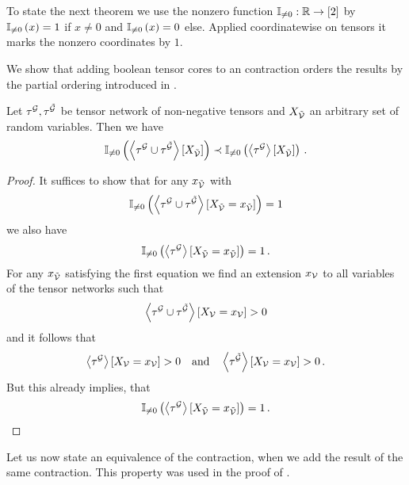 
To state the next theorem we use the nonzero function $\mathbb{I}_{\neq0}: \mathbb{R} \rightarrow [2]$ by $\mathbb{I}_{\neq0}\left(x\right)=1$ if $x\neq0$ and $\mathbb{I}_{\neq0}\left(x\right)=0$ else.
Applied coordinatewise on tensors it marks the nonzero coordinates by $1$.

We show that adding boolean tensor cores to an contraction orders the results by the partial ordering introduced in .

\begin{theorem}\label{the:monotonicityBinaryContractions}
	Let $\tau^{\mathcal{G}}, \tau^{\tilde{\mathcal{G}}}$ be tensor network of non-negative tensors and $X_{\tilde{\mathcal{V}}}$ an arbitrary set of random variables. %
	Then we have
	\begin{align*}
		\mathbb{I}_{\neq0}\left(\left\langle \tau^{\mathcal{G}}\cup\tau^{\tilde{\mathcal{G}}}\right\rangle \left[ X_{\tilde{\mathcal{V}}} \right]\right) \prec
		\mathbb{I}_{\neq0}\left(\left\langle \tau^{\mathcal{G}}\right\rangle \left[ X_{\tilde{\mathcal{V}}} \right]\right) \, .
	\end{align*}
\end{theorem}
\begin{proof}
	It suffices to show that for any $x_{\tilde{\mathcal{V}}}$ with
		\[ \mathbb{I}_{\neq0}\left(\left\langle \tau^{\mathcal{G}}\cup\tau^{\tilde{\mathcal{G}}}\right\rangle \left[ X_{\tilde{\mathcal{V}}}=x_{\tilde{\mathcal{V}}} \right]\right)=1 \]
	we also have
		\[ \mathbb{I}_{\neq0}\left(\left\langle \tau^{\mathcal{G}}\right\rangle \left[ X_{\tilde{\mathcal{V}}}=x_{\tilde{\mathcal{V}}} \right]\right)=1 \, . \]
	For any $x_{\tilde{\mathcal{V}}}$ satisfying the first equation we find an extension $x_{\mathcal{V}}$ to all variables of the tensor networks such that
		\[ \left\langle \tau^{\mathcal{G}}\cup\tau^{\tilde{\mathcal{G}}}\right\rangle \left[ X_{\mathcal{V}}=x_{\mathcal{V}} \right] > 0 \]
	and it follows that
		\[ \left\langle \tau^{\mathcal{G}}\right\rangle \left[ X_{\mathcal{V}}=x_{\mathcal{V}} \right] > 0 \quad\text{and}\quad  \left\langle \tau^{\tilde{\mathcal{G}}}\right\rangle \left[ X_{\mathcal{V}}=x_{\mathcal{V}} \right] > 0  \, . \]
	But this already implies, that
		\[ \mathbb{I}_{\neq0}\left(\left\langle \tau^{\mathcal{G}}\right\rangle \left[ X_{\tilde{\mathcal{V}}}=x_{\tilde{\mathcal{V}}} \right]\right)=1 \, . \]
\end{proof}


Let us now state an equivalence of the contraction, when we add the result of the same contraction.
This property was used in the proof of .

